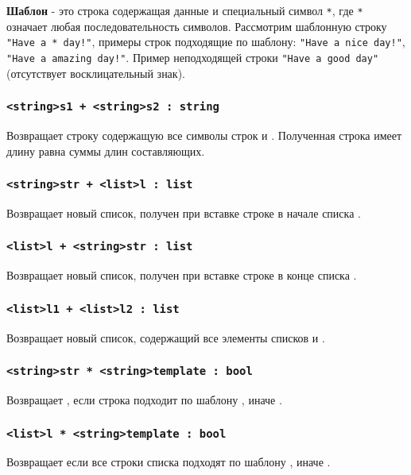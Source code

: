 \documentclass[a4paper, 14pt]{extarticle}
\begin{document}
{\bf Шаблон} - это строка содержащая данные и специальный символ \lstinline`*`, где \lstinline`*` означает любая последовательность символов. Рассмотрим шаблонную строку \lstinline`"Have a * day!"`, примеры строк подходящие по шаблону: \lstinline`"Have a nice day!"`, \lstinline`"Have a amazing day!"`. Пример неподходящей строки \lstinline`"Have a good day"` (отсутствует восклицательный знак).

\subsubsection{\lstinline`<string>s1 + <string>s2 : string`}
Возвращает строку содержащую все символы строк  и . Полученная строка имеет длину равна суммы длин составляющих.

\subsubsection{\lstinline`<string>str + <list>l : list`}
Возвращает новый список, получен при вставке строке  в начале списка .

\subsubsection{\lstinline`<list>l + <string>str : list`}
Возвращает новый список, получен при вставке строке  в конце списка .

\subsubsection{\lstinline`<list>l1 + <list>l2 : list`}
Возвращает новый список, содержащий все элементы списков  и .

\subsubsection{\lstinline`<string>str * <string>template : bool`}
Возвращает , если строка  подходит по шаблону , иначе .

\subsubsection{\lstinline`<list>l * <string>template : bool`}
Возвращает  если все строки списка  подходят по шаблону , иначе .
\end{document}
